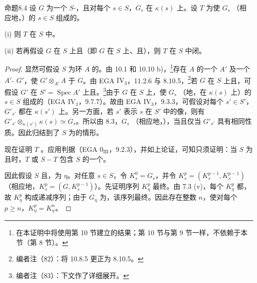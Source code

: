 \begin{SGAresult}{命题}{8.4}
设 $G$ 为一个 $S$-，且对每个 $s\in S$，$G_s$ 在 $\kappa(s)$ 上。设 $T$ 为使 $G_s$ （相应地，）的 $s\in S$ 组成的。

(i) 则 $T$ 在 $S$ 中。

(ii) 若再假设 $G$ 在 $S$ 上且（即 $G$ 在 $S$ 上、且），则 $T$ 在 $S$ 中闭。
\end{SGAresult}
\begin{proof}
显然可假设 $S$ 为环 $A$ 的。由 10.1 和 10.10 b)，\footnote{在本证明中将使用第 10 节建立的结果；第 10 节与第 9 节一样，不依赖于本节（第 8 节）。}存在 $A$ 的一个 $A'$ 及一个 $A'$- $G'$，使 $G'\otimes_{A'}A$ 于 $G$。由 EGA $\mathrm{IV}_3$，11.2.6 与 8.10.5，\footnote{编者注（82）：将 10.8.5 更正为 8.10.5。}若 $G$ 在 $S$ 上且，可假设 $G'$ 在 $S'=\operatorname{Spec}A'$ 上且。\footnote{编者注（83）：下文作了详细展开。}由于 $G$ 在 $S$ 上，使 $G_s$ （地，在 $\kappa(s)$ 上）的 $s\in S$ 组成的（EGA $\mathrm{IV}_3$，9.7.7）。故由 EGA $\mathrm{IV}_3$，9.3.3，可假设对每个 $s'\in S'$，$G'_{s'}$ 都在 $\kappa(s')$ 上。另一方面，若 $s'$ 表示 $s$ 在 $S'$ 中的像，则有 $G'_{s'}\otimes_{\kappa(s')}\kappa(s)\simeq G_s$。所以由 8.3，$G_s$ （相应地，），当且仅当 $G'_{s'}$ 具有相同性质。因此归结到了 $S$ 为的情形。

现在证明 $T$ 。应用判据（EGA $0_{\mathrm{III}}$，9.2.3），并如上论证，可知只须证明：当 $S$ 为且时，$T$ 或 $S-T$ 包含 $S$ 的一个。

因此假设 $S$ 且，为 $\eta$。对任意 $s\in S$，令 $K_s^0=G_s$，并令 $K_s^p=(K_s^{p-1},K_s^{p-1})$（相应地，$K_s^p=(G,K_s^{p-1})$）。先证明序列 $K_\eta^p$ 最终。由 7.3 (v)，每个 $K_\eta^p$ 都，故 $K_\eta^p$ 构成递减序列；由于 $G_\eta$ 为，该序列最终。因此存在整数 $n$，使对每个 $p\geq n$，$K_\eta^p=K_\eta^n$。


\end{proof}

